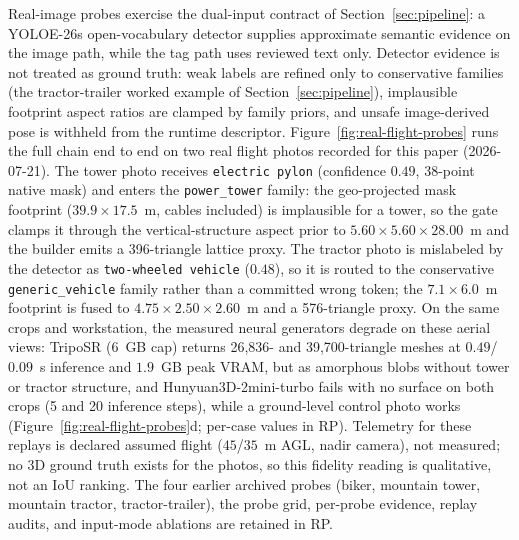 \documentclass[11pt,a4paper]{article}
\begin{document}
Real-image probes exercise the dual-input contract of
Section~\ref{sec:pipeline}: a YOLOE-26s
open-vocabulary detector supplies approximate semantic evidence on the image
path, while the tag path uses reviewed text only. Detector evidence is not
treated as ground truth: weak labels are refined only to conservative
families (the tractor-trailer worked example of
Section~\ref{sec:pipeline}), implausible footprint aspect ratios are clamped by family priors, and
unsafe image-derived pose is withheld from the runtime descriptor.
Figure~\ref{fig:real-flight-probes} runs the full chain end to end on two
real flight photos recorded for this paper (2026-07-21). The tower photo
receives \texttt{electric pylon} (confidence \(0.49\), 38-point native mask)
and enters the \texttt{power\_tower} family: the geo-projected mask footprint
(\(39.9\times17.5\)~m, cables included) is implausible for a tower, so the
gate clamps it through the vertical-structure aspect prior to
\(5.60\times5.60\times28.00\)~m and the builder emits a 396-triangle lattice
proxy. The tractor photo is mislabeled by the detector as
\texttt{two-wheeled vehicle} (\(0.48\)), so it is routed to the conservative
\texttt{generic\_vehicle} family rather than a committed wrong token; the
\(7.1\times6.0\)~m footprint is fused to \(4.75\times2.50\times2.60\)~m and a
576-triangle proxy. On the same crops and workstation, the measured neural
generators degrade on these aerial views: TripoSR (6~GB cap) returns
26{,}836- and 39{,}700-triangle meshes at \(0.49\)/\(0.09\)~s inference and
\(1.9\)~GB peak VRAM, but as amorphous blobs without tower or tractor
structure, and Hunyuan3D-2mini-turbo fails with no surface on both crops (5
and 20 inference steps), while a ground-level control photo works
(Figure~\ref{fig:real-flight-probes}d; per-case values in RP). Telemetry
for these replays is declared assumed flight
(\(45\)/\(35\)~m AGL, nadir camera), not measured; no 3D ground truth
exists for the photos, so this fidelity reading is qualitative, not an IoU
ranking. The four earlier archived probes (biker, mountain
tower, mountain tractor, tractor-trailer), the probe grid, per-probe
evidence, replay audits, and input-mode ablations are retained in RP.
\end{document}
